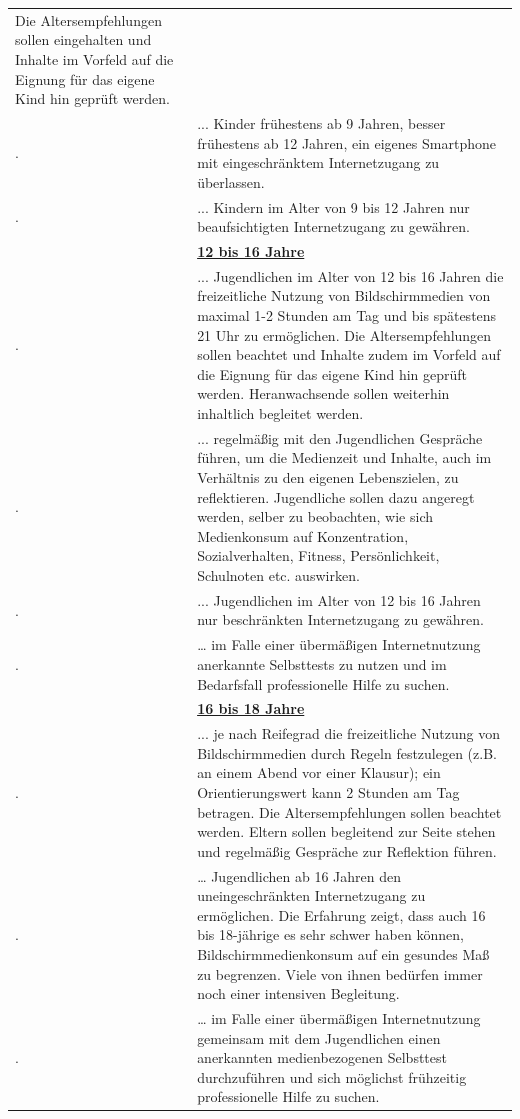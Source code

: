 \documentclass[
  letterpaper,
  DIV=11]{scrartcl}
\begin{document}
\begin{longtable}[]{@{}
  >{\raggedright\arraybackslash}p{}
  >{\raggedright\arraybackslash}p{}@{}}
Die Altersempfehlungen sollen eingehalten und Inhalte im Vorfeld auf die
Eignung für das eigene Kind hin geprüft werden. \\
31. & ... Kinder frühestens ab 9 Jahren, besser frühestens ab 12 Jahren,
ein eigenes Smartphone mit eingeschränktem Internetzugang zu
überlassen. \\
32. & ... Kindern im Alter von 9 bis 12 Jahren nur beaufsichtigten
Internetzugang zu gewähren. \\
& \ul{\textbf{12 bis 16 Jahre}} \\
33. & ... Jugendlichen im Alter von 12 bis 16 Jahren die freizeitliche
Nutzung von Bildschirmmedien von maximal 1-2 Stunden am Tag und bis
spätestens 21 Uhr zu ermöglichen. Die Altersempfehlungen sollen beachtet
und Inhalte zudem im Vorfeld auf die Eignung für das eigene Kind hin
geprüft werden. Heranwachsende sollen weiterhin inhaltlich begleitet
werden. \\
34. & ... regelmäßig mit den Jugendlichen Gespräche führen, um die
Medienzeit und Inhalte, auch im Verhältnis zu den eigenen Lebenszielen,
zu reflektieren. Jugendliche sollen dazu angeregt werden, selber zu
beobachten, wie sich Medienkonsum auf Konzentration, Sozialverhalten,
Fitness, Persönlichkeit, Schulnoten etc. auswirken. \\
35. & ... Jugendlichen im Alter von 12 bis 16 Jahren nur beschränkten
Internetzugang zu gewähren. \\
36. & \ldots{} im Falle einer übermäßigen Internetnutzung anerkannte
Selbsttests zu nutzen und im Bedarfsfall professionelle Hilfe zu
suchen. \\
& \ul{\textbf{16 bis 18 Jahre}} \\
37. & ... je nach Reifegrad die freizeitliche Nutzung von
Bildschirmmedien durch Regeln festzulegen (z.B. an einem Abend vor einer
Klausur); ein Orientierungswert kann 2 Stunden am Tag betragen. Die
Altersempfehlungen sollen beachtet werden. Eltern sollen begleitend zur
Seite stehen und regelmäßig Gespräche zur Reflektion führen. \\
38. & \ldots{} Jugendlichen ab 16 Jahren den uneingeschränkten
Internetzugang zu ermöglichen. Die Erfahrung zeigt, dass auch 16 bis
18-jährige es sehr schwer haben können, Bildschirmmedienkonsum auf ein
gesundes Maß zu begrenzen. Viele von ihnen bedürfen immer noch einer
intensiven Begleitung. \\
39. & \ldots{} im Falle einer übermäßigen Internetnutzung gemeinsam mit
dem Jugendlichen einen anerkannten medienbezogenen Selbsttest
durchzuführen und sich möglichst frühzeitig professionelle Hilfe zu
suchen. \\
\end{longtable}
\end{document}
